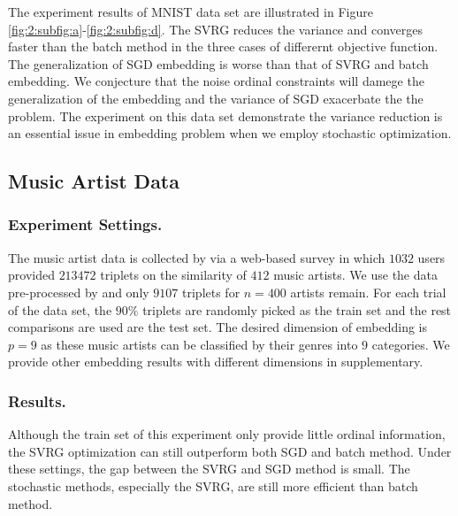 \documentclass[letterpaper]{article}
\newcommand{\qqxu}[1]{\textcolor[rgb]{0.00,1.00,0.00}{#1}}
\begin{document}
		The experiment results of MNIST data set are illustrated in Figure \ref{fig:2:subfig:a}-\ref{fig:2:subfig:d}. The SVRG reduces the variance and  converges faster than the batch method in the three cases of differernt objective function. The generalization of SGD embedding is worse than that of SVRG and batch embedding. We conjecture that the noise ordinal constraints will damege the generalization of the embedding and the variance of SGD exacerbate the the problem. The experiment on this data set demonstrate the variance reduction is an essential issue in embedding problem when we employ stochastic optimization.

		\subsection{Music Artist Data}

		\subsubsection{Experiment Settings.}

		The music artist data is collected by \cite{ellis2002quest} via a web-based survey in which $1032$ users provided $213472$ triplets on the similarity of $412$ music artists. We use the data pre-processed by \cite{vandermaaten2012stochastic} and only $9107$ triplets for $n=400$ artists remain. For each trial of the data set, the $90\%$ triplets are randomly picked as the train set and the rest comparisons are used are the test set. The desired dimension of embedding is $p = 9$ as these music artists can be classified by their genres into $9$ categories. We provide other embedding results with different dimensions in supplementary.

		\subsubsection{Results.}
		
		Although the train set of this experiment only provide little ordinal information, the SVRG optimization can still outperform both SGD and batch method. Under these settings, the gap between the SVRG and SGD method is small. The stochastic methods, especially the SVRG, are still more efficient than batch method.

\end{document}
